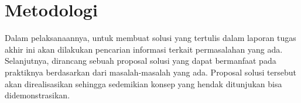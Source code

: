 \section{Metodologi}

Dalam pelaksanaannya, untuk membuat solusi yang tertulis dalam laporan tugas akhir ini akan dilakukan pencarian informasi terkait permasalahan yang ada.
Selanjutnya, dirancang sebuah proposal solusi yang dapat bermanfaat pada praktiknya berdasarkan dari masalah-masalah yang ada.
Proposal solusi tersebut akan direalisasikan sehingga sedemikian konsep yang hendak ditunjukan bisa didemonstrasikan.
